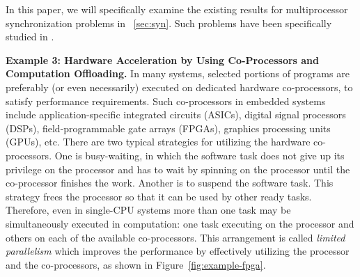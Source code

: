 
In this paper, we will specifically examine the existing results for multiprocessor synchronization problems in \mysectionref{}~\ref{sec:syn}. Such problems have been specifically studied in \cite{rajkumar-1990,lakshmanan-2009,zeng-2011,bbb-2013,yang-2013,kim-2014,han-2014,carminati-2014,yang-2014}. 

{\bf Example 3: Hardware Acceleration by Using Co-Processors and Computation Offloading.} In many systems, selected portions of programs are preferably (or even necessarily) executed on dedicated hardware co-processors, to satisfy performance requirements.  Such co-processors in embedded systems include application-specific integrated circuits (ASICs), digital signal processors (DSPs), field-programmable gate arrays (FPGAs), graphics processing units (GPUs), etc. There are two typical strategies for utilizing the hardware co-processors. One is busy-waiting, in which the software task does not give up its privilege on the processor and has to wait by spinning on the processor until the co-processor finishes the work. Another is to suspend the software task. This strategy frees the processor so that it can be used by other ready tasks. Therefore, even in single-CPU systems more than one task may be simultaneously executed in computation: one task executing on the processor and others on each of the available co-processors. This arrangement is called \emph{limited parallelism} \cite{RTAS-AudsleyB04} which improves the performance by effectively utilizing the processor and the co-processors, as shown in Figure~\ref{fig:example-fpga}.


